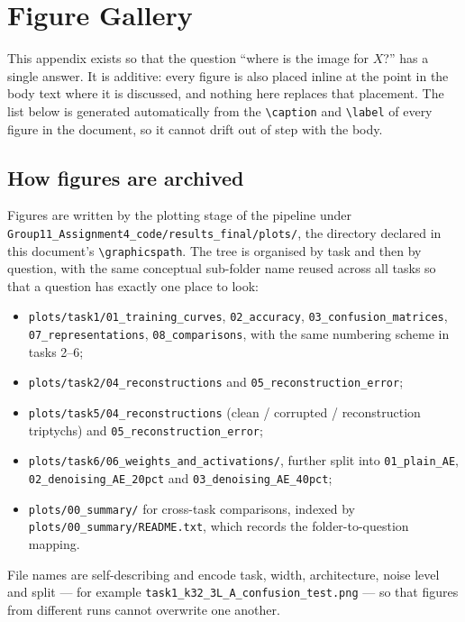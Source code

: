 \documentclass[11pt,a4paper]{article}
\newcommand{\code}[1]{\texttt{#1}}
\begin{document}
\appendix
\section{Figure Gallery}\label{sec:gallery}
This appendix exists so that the question ``where is the image for $X$?'' has a single answer.  It
is additive: every figure is also placed inline at the point in the body text where it is discussed,
and nothing here replaces that placement.  The list below is generated automatically from the
\code{\textbackslash caption} and \code{\textbackslash label} of every figure in the document, so it
cannot drift out of step with the body.

\listoffigures

\subsection{How figures are archived}\label{sec:gallery:policy}
Figures are written by the plotting stage of the pipeline under
\code{Group11\_Assignment4\_code/results\_final/plots/}, the directory declared in this document's
\code{\textbackslash graphicspath}.  The tree is organised by task and then by question, with the
same conceptual sub-folder name reused across all tasks so that a question has exactly one place to
look:
\begin{itemize}[leftmargin=1.6em,itemsep=1pt]
\item \code{plots/task1/01\_training\_curves}, \code{02\_accuracy},
  \code{03\_confusion\_matrices}, \code{07\_representations}, \code{08\_comparisons}, with the same
  numbering scheme in tasks 2--6;
\item \code{plots/task2/04\_reconstructions} and \code{05\_reconstruction\_error};
\item \code{plots/task5/04\_reconstructions} (clean / corrupted / reconstruction triptychs) and
  \code{05\_reconstruction\_error};
\item \code{plots/task6/06\_weights\_and\_activations/}, further split into
  \code{01\_plain\_AE}, \code{02\_denoising\_AE\_20pct} and \code{03\_denoising\_AE\_40pct};
\item \code{plots/00\_summary/} for cross-task comparisons, indexed by
  \code{plots/00\_summary/README.txt}, which records the folder-to-question mapping.
\end{itemize}
File names are self-describing and encode task, width, architecture, noise level and split --- for
example \code{task1\_k32\_3L\_A\_confusion\_test.png} --- so that figures from different runs cannot
overwrite one another.
\end{document}
